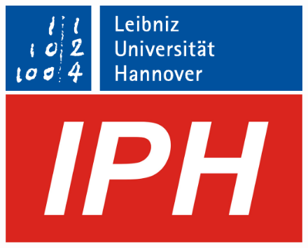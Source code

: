 \begin{titlepage}
\begin{spacing}{1}
\begin{figure}[htbp]
    \begin{minipage}[b]{60mm}
        \vspace{0pt}
        \centering
        \includegraphics[width=\linewidth]{images/luh_logo.pdf}
        \end{minipage}
    \hfill
    \begin{minipage}[b]{40mm}
        \vspace{0pt}
        \centering
        \includegraphics[width=\linewidth]{images/IPH_Logo.jpg}
    \end{minipage}
\end{figure}



\end{spacing}
\end{titlepage}
